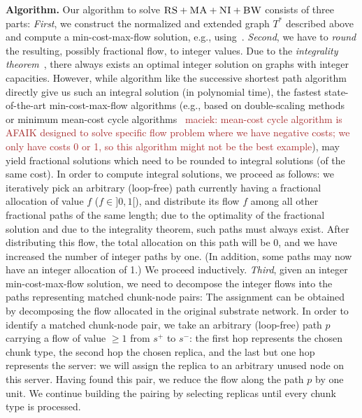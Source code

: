 \documentclass[9pt]{sigcomm-alternate}
\newcommand{\maciek}[1]{\textcolor{brown}{maciek: #1}}
\newcommand{\Source}{\ensuremath{s^{+}}}
\newcommand{\Sink}{\ensuremath{s^{-}}}
\newcommand{\CC}{\textsc{NI}}
\newcommand{\RS}{\textsc{RS}}
\newcommand{\BW}{\textsc{BW}}
\newcommand{\MA}{\textsc{MA}}
\newcommand{\Tree}{\ensuremath{T}}
\begin{document}
\textbf{Algorithm.}
Our algorithm to solve $\RS+\MA+\CC+\BW$ consists of three parts:
\emph{First}, we construct the normalized and extended graph $\Tree^*$
described above and compute
a min-cost-max-flow solution, e.g., using~\cite{mincostmaxflow-1,mincostmaxflow-2}.
\emph{Second}, we have to \emph{round} the resulting, possibly fractional flow, to
integer values. Due to the \emph{integrality theorem}~\cite{flow-book},
there always exists an optimal integer solution on graphs with integer capacities.
However, while algorithm like the successive shortest path algorithm~\cite{successive_shortest_path_complexity}
directly give us such an integral solution (in polynomial time), the fastest state-of-the-art min-cost-max-flow algorithms (e.g., based on double-scaling
methods~\cite{mincostmaxflow-1} or minimum mean-cost cycle algorithms~\cite{mincostmaxflow-2} \maciek{mean-cost cycle algorithm is AFAIK designed to solve specific flow problem where we have negative costs; we only have costs 0 or 1, so this algorithm might not  be the best example}), may yield fractional solutions
which need to be rounded to integral solutions (of the same cost).
In order to compute integral solutions, we proceed as follows: we iteratively pick an arbitrary (loop-free) path
currently having a fractional allocation of value $f$ ($f\in ]0,1[$), and distribute its flow $f$
among all other fractional paths of the same length; due to the optimality of the fractional solution
and due to the integrality theorem, such paths must always exist. After distributing this flow,
the total allocation on this path will be 0, and we have increased the number of integer paths by one.
(In addition, some paths may now have an integer allocation of 1.) We proceed inductively.
\emph{Third}, given an integer min-cost-max-flow solution, we need to decompose the integer flows into the paths
representing matched chunk-node pairs:
The assignment can be obtained by decomposing the flow allocated in the
original substrate network. In order to identify a matched chunk-node pair,
we take an arbitrary (loop-free) path $p$ carrying a flow of value  $\geq 1$ from $\Source$ to $\Sink$:
the first hop represents the chosen chunk type, the second hop the chosen
replica, and the last but one hop represents the server: we will assign
the replica to an arbitrary unused node on this server.
Having found this pair, we reduce the flow
along the path $p$ by one unit.
We continue building the pairing by selecting replicas until every chunk type is processed.
\end{document}

